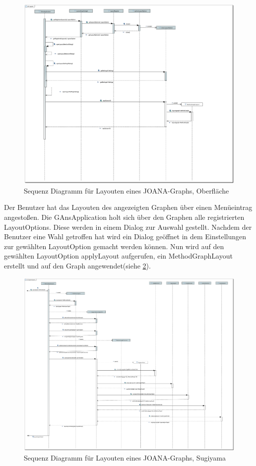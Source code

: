 \begin{figure}[!htbp]
	\centering
	\includegraphics[width=450pt]{resourcen/SeqDiagramLayout.PDF}
	\caption{Sequenz Diagramm für Layouten eines JOANA-Graphs, Oberfläche}
	\label{fig:seq:layout}
\end{figure}

Der Benutzer hat das Layouten des angezeigten Graphen über einen Menüeintrag angestoßen. Die GAnsApplication holt sich über den Graphen alle registrierten LayoutOptions. Diese werden in einem Dialog zur Auswahl gestellt. Nachdem der Benutzer eine Wahl getroffen hat wird ein Dialog geöffnet in dem Einstellungen zur gewählten LayoutOption gemacht werden können. Nun wird auf den gewählten LayoutOption applyLayout aufgerufen, ein MethodGraphLayout erstellt und auf den Graph angewendet(siehe \ref{fig:seq:layoutSugi}).
\newpage

\begin{figure}[!htbp]
	\centering
	\includegraphics[width=450pt]{resourcen/SeqDiagramSugiyama.PDF}
	\caption{Sequenz Diagramm für Layouten eines JOANA-Graphs, Sugiyama}
	\label{fig:seq:layoutSugi}
\end{figure}

